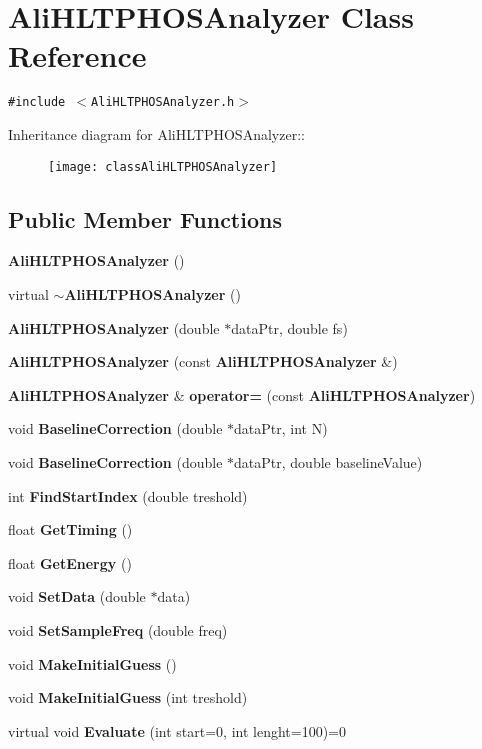\section{Ali\-HLTPHOSAnalyzer Class Reference}
\label{classAliHLTPHOSAnalyzer}
{\tt \#include $<$Ali\-HLTPHOSAnalyzer.h$>$}

Inheritance diagram for Ali\-HLTPHOSAnalyzer::\begin{figure}[H]
\begin{center}
\leavevmode
\texttt{[image: classAliHLTPHOSAnalyzer]}
\end{center}
\end{figure}
\subsection*{Public Member Functions}
\begin{CompactItemize}
\item 
{\bf Ali\-HLTPHOSAnalyzer} ()
\item 
virtual {\bf $\sim$Ali\-HLTPHOSAnalyzer} ()
\item 
{\bf Ali\-HLTPHOSAnalyzer} (double $\ast$data\-Ptr, double fs)
\item 
{\bf Ali\-HLTPHOSAnalyzer} (const {\bf Ali\-HLTPHOSAnalyzer} \&)
\item 
{\bf Ali\-HLTPHOSAnalyzer} \& {\bf operator=} (const {\bf Ali\-HLTPHOSAnalyzer})
\item 
void {\bf Baseline\-Correction} (double $\ast$data\-Ptr, int N)
\item 
void {\bf Baseline\-Correction} (double $\ast$data\-Ptr, double baseline\-Value)
\item 
int {\bf Find\-Start\-Index} (double treshold)
\item 
float {\bf Get\-Timing} ()
\item 
float {\bf Get\-Energy} ()
\item 
void {\bf Set\-Data} (double $\ast$data)
\item 
void {\bf Set\-Sample\-Freq} (double freq)
\item 
void {\bf Make\-Initial\-Guess} ()
\item 
void {\bf Make\-Initial\-Guess} (int treshold)
\item 
virtual void {\bf Evaluate} (int start=0, int lenght=100)=0
\end{CompactItemize}
